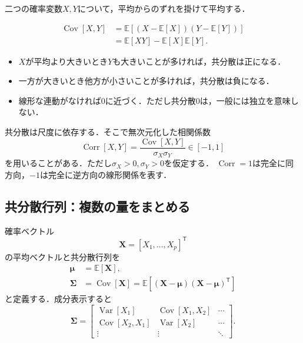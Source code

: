 \documentclass[a4paper,11pt]{ltjsarticle}
\newcommand{\E}{\mathbb E}
\newcommand{\T}{\mathsf T}
\newcommand{\Var}{\operatorname{Var}}
\newcommand{\Cov}{\operatorname{Cov}}
\newcommand{\Corr}{\operatorname{Corr}}
\begin{document}
二つの確率変数\(X,Y\)について，平均からのずれを掛けて平均する．
\begin{definitionbox}[共分散]
\begin{align}
  \Cov[X,Y]
  &=\E\left[(X-\E[X])(Y-\E[Y])\right]
  \label{eq:covariance-definition}\\
  &=\E[XY]-\E[X]\E[Y].
\end{align}
\end{definitionbox}

\begin{itemize}
  \item \(X\)が平均より大きいとき\(Y\)も大きいことが多ければ，共分散は正になる．
  \item 一方が大きいとき他方が小さいことが多ければ，共分散は負になる．
  \item 線形な連動がなければ0に近づく．ただし共分散0は，一般には独立を意味しない．
\end{itemize}

共分散は尺度に依存する．そこで無次元化した相関係数
\begin{equation}
  \Corr[X,Y]
  =\frac{\Cov[X,Y]}{\sigma_X\sigma_Y}
  \in[-1,1]
  \label{eq:correlation}
\end{equation}
を用いることがある．ただし\(\sigma_X>0,\sigma_Y>0\)を仮定する．
\(\Corr=1\)は完全に同方向，\(-1\)は完全に逆方向の線形関係を表す．

\subsection{共分散行列：複数の量をまとめる}

確率ベクトル
\begin{equation}
  \bm X=[X_1,\ldots,X_p]^\T
\end{equation}
の平均ベクトルと共分散行列を
\begin{align}
  \bm\mu&=\E[\bm X],\\
  \bm\Sigma
  &=\Cov[\bm X]
  =\E[(\bm X-\bm\mu)(\bm X-\bm\mu)^\T]
  \label{eq:covariance-matrix}
\end{align}
と定義する．成分表示すると
\begin{equation}
  \bm\Sigma=
  \begin{bmatrix}
    \Var[X_1]&\Cov[X_1,X_2]&\cdots\\
    \Cov[X_2,X_1]&\Var[X_2]&\cdots\\
    \vdots&\vdots&\ddots
  \end{bmatrix}.
  \label{eq:covariance-matrix-elements}
\end{equation}
\end{document}
